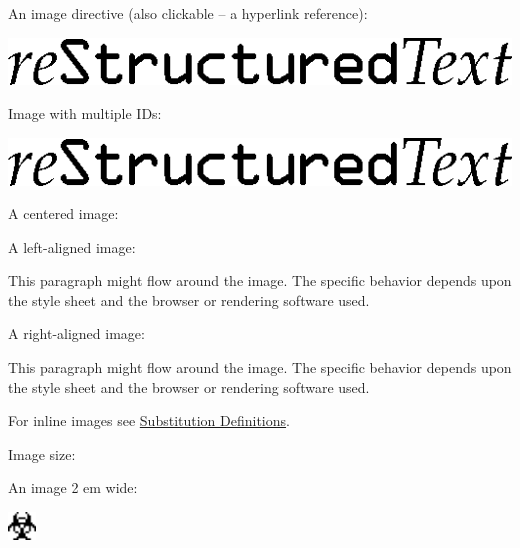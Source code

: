 \documentclass[a4paper]{article}
\begin{document}
An image directive (also clickable -- a hyperlink reference):

\hyperref[directives]{\includegraphics{../../../docs/user/rst/images/title.png}}

Image with multiple IDs:

\includegraphics{../../../docs/user/rst/images/title.png}
\label{image-target-3}\label{image-target-2}\label{image-target-1}

A centered image:

\noindent{}

A left-aligned image:


This paragraph might flow around the image.
The specific behavior depends upon the style sheet and
the browser or rendering software used.

A right-aligned image:


This paragraph might flow around the image.
The specific behavior depends upon the style sheet and
the browser or rendering software used.

For inline images see \hyperref[substitution-definitions]{Substitution Definitions}.

Image size:

An image 2 em wide:

\includegraphics[width=2em]{../../../docs/user/rst/images/biohazard.png}
\end{document}
